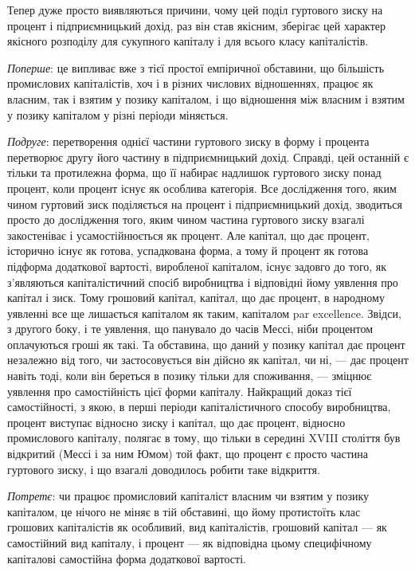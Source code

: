 Тепер дуже просто виявляються причини, чому цей поділ
гуртового зиску на процент і підприємницький дохід, раз він
став якісним, зберігає цей характер якісного розподілу для сукупного
капіталу і для всього класу капіталістів.

\emph{Поперше}: це випливає вже з тієї простої емпіричної обставини,
що більшість промислових капіталістів, хоч і в різних числових
відношеннях, працює як власним, так і взятим у позику
капіталом, і що відношення між власним і взятим у позику капіталом
у різні періоди міняється.

\emph{Подруге}: перетворення однієї частини гуртового зиску в форму і
процента перетворює другу його частину в підприємницький
дохід. Справді, цей останній є тільки та протилежна форма, що
її набирає надлишок гуртового зиску понад процент, коли процент
існує як особлива категорія. Все дослідження того, яким
чином гуртовий зиск поділяється на процент і підприємницький
дохід, зводиться просто до дослідження того, яким чином частина
гуртового зиску взагалі закостеніває і усамостійнюється
як процент. Але капітал, що дає процент, історично існує як
готова, успадкована форма, а тому й процент як готова підформа
додаткової вартості, виробленої капіталом, існує задовго
до того, як з’являються капіталістичний спосіб виробництва і
відповідні йому уявлення про капітал і зиск. Тому грошовий капітал,
капітал, що дає процент, в народному уявленні все ще лишається
капіталом як таким, капіталом par excellence. Звідси, з
другого боку, і те уявлення, що панувало до часів Мессі, ніби процентом
оплачуються гроші як такі. Та обставина, що даний у
позику капітал дає процент незалежно від того, чи застосовується
він дійсно як капітал, чи ні, — дає процент навіть тоді, коли він береться
в позику тільки для споживання, — зміцнює уявлення про
самостійність цієї форми капіталу. Найкращий доказ тієї самостійності,
з якою, в перші періоди капіталістичного способу
виробництва, процент виступає відносно зиску і капітал, що дає
процент, відносно промислового капіталу, полягає в тому, що
тільки в середині XVIII століття був відкритий (Мессі і за ним
Юмом) той факт, що процент є просто частина гуртового зиску,
і що взагалі доводилось робити таке відкриття.

\emph{Потретє}: чи працює промисловий капіталіст власним чи
взятим у позику капіталом, це нічого не міняє в тій обставині,
що йому протистоїть клас грошових капіталістів як особливий,
вид капіталістів, грошовий капітал — як самостійний вид капіталу,
і процент — як відповідна цьому специфічному капіталові самостійна
форма додаткової вартості.

